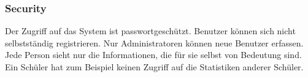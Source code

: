 \subsubsection*{Security}
Der Zugriff auf das System ist passwortgeschützt. Benutzer können sich nicht selbstständig registrieren. Nur Administratoren können neue Benutzer erfassen.
Jede Person sieht nur die Informationen, die für sie selbst von Bedeutung sind. Ein Schüler hat zum Beispiel keinen Zugriff auf die Statistiken anderer Schüler.


\newpage